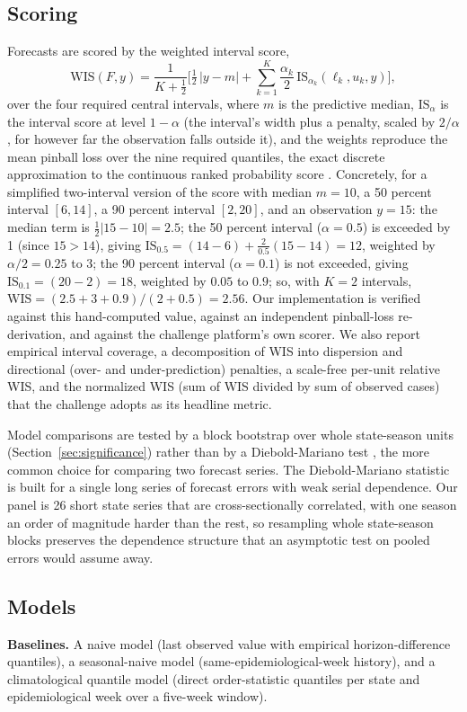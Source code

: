 \documentclass[11pt]{article}
\begin{document}
\subsection{Scoring}\label{sec:methods-scoring}
Forecasts are scored by the weighted interval score,
\[
\mathrm{WIS}(F,y)=\frac{1}{K+\tfrac12}\Big[\tfrac12\,|y-m|+\sum_{k=1}^{K}\frac{\alpha_k}{2}\,
\mathrm{IS}_{\alpha_k}(\ell_k,u_k,y)\Big],
\]
over the four required central intervals, where $m$ is the predictive median, $\mathrm{IS}_{\alpha}$
is the interval score at level $1-\alpha$ (the interval's width plus a penalty, scaled by $2/\alpha$,
for however far the observation falls outside it), and the weights reproduce the mean pinball loss
over the
nine required quantiles, the exact discrete approximation to the continuous ranked probability score
\citep{gneiting2007,bracher2021}. Concretely, for a simplified two-interval version of the score with median $m=10$, a
50 percent interval $[6,14]$, a 90 percent interval $[2,20]$, and an observation $y=15$: the median
term is $\tfrac12|15-10|=2.5$; the 50 percent interval ($\alpha=0.5$) is exceeded by 1 (since
$15>14$), giving
$\mathrm{IS}_{0.5}=(14-6)+\tfrac{2}{0.5}(15-14)=12$, weighted by $\alpha/2=0.25$ to $3$; the 90
percent interval ($\alpha=0.1$) is not exceeded, giving $\mathrm{IS}_{0.1}=(20-2)=18$, weighted by
$0.05$ to $0.9$;
so, with $K=2$ intervals, $\mathrm{WIS}=(2.5+3+0.9)/(2+0.5)=2.56$. Our implementation is verified
against this hand-computed
value, against an independent pinball-loss re-derivation, and against the challenge platform's own
scorer. We also report empirical interval coverage, a decomposition of WIS into dispersion and
directional (over- and under-prediction) penalties, a scale-free per-unit relative WIS, and the
normalized WIS (sum of WIS divided by sum of observed cases) that the challenge adopts as its headline
metric.

Model comparisons are tested by a block bootstrap over whole state-season units
(Section~\ref{sec:significance}) rather than by a Diebold-Mariano test \citep{diebold1995}, the
more common choice for comparing two forecast series. The Diebold-Mariano statistic is built for a
single long series of forecast errors with weak serial dependence. Our panel is 26 short state
series that are cross-sectionally correlated, with one season an order of magnitude harder than
the rest, so resampling whole state-season blocks preserves the dependence structure that an
asymptotic test on pooled errors would assume away.

\subsection{Models}
\textbf{Baselines.} A naive model (last observed value with empirical horizon-difference quantiles), a
seasonal-naive model (same-epidemiological-week history), and a climatological quantile model (direct
order-statistic quantiles per state and epidemiological week over a five-week window).
\end{document}
